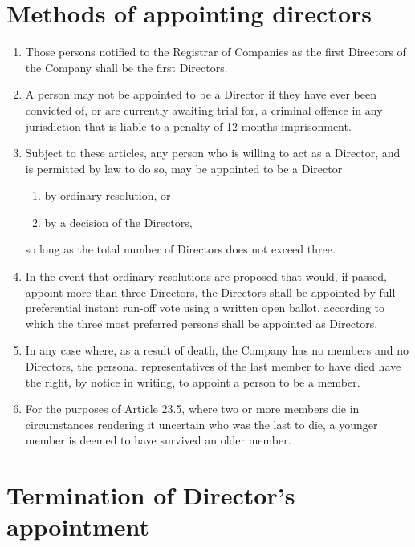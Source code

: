 \documentclass[a4paper,12pt]{article}
\renewcommand{\labelenumii}{(\alph{enumii})}
\begin{document}
\section{Methods of appointing directors}

\begin{enumerate}
  \item Those persons notified to the Registrar of Companies as the first Directors of the Company shall be the first Directors.
  \item A person may not be appointed to be a Director if they have ever been convicted of, or are currently awaiting trial for, a criminal offence in any jurisdiction that is liable to a penalty of 12 months imprisonment. %
  \item Subject to these articles, any person who is willing to act as a Director, and is permitted by law to do so, may be appointed to be a Director
  \begin{enumerate}
    \renewcommand{\labelenumii}{(\alph{enumii})}
    \item by ordinary resolution, or
    \item by a decision of the Directors,
  \end{enumerate}
  so long as the total number of Directors does not exceed three. %
  \item In the event that ordinary resolutions are proposed that would, if passed, appoint more than three Directors, the Directors shall be appointed by full preferential instant run-off vote using a written open ballot, according to which the three most preferred persons shall be appointed as Directors. %
  \item In any case where, as a result of death, the Company has no members and no Directors, the personal representatives of the last member to have died have the right, by notice in writing, to appoint a person to be a member.
  \item For the purposes of Article 23.5, where two or more members die in circumstances rendering it uncertain who was the last to die, a younger member is deemed to have survived an older member.
\end{enumerate}

\section{Termination of Director’s appointment}
\end{document}
